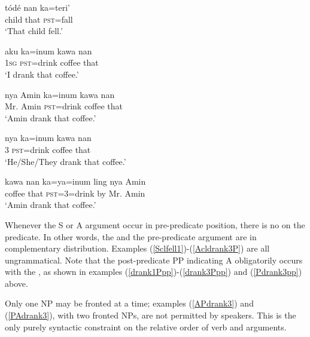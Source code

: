 \documentclass[output=paper
,modfonts
,nonflat]{langsci/langscibook}
\begin{document}
\ea\label{Sfell3}
\gll t\'od\'e nan ka=teri’\\
child that \textsc{pst}=fall\\
\glt `That child fell.’
\z

\ea\label{Adrank1P}
\gll aku	ka=inum		kawa	nan\\
\textsc{1sg}	\textsc{pst}=drink	coffee	that\\
\glt `I drank that coffee.’
\z

\ea\label{npdrank3P}
\gll nya Amin	ka=inum		kawa	nan\\
Mr. Amin	\textsc{pst}=drink	coffee	that\\
\glt `Amin drank that coffee.’
\z

\ea\label{prodrank3P}
\gll nya	ka=inum		kawa	nan\\
3		\textsc{pst}=drink	coffee	that\\
\glt `He/She/They drank that coffee.’
\z

\ea\label{Pdrank3pp}
\gll kawa	nan	ka=ya=inum	ling	nya Amin\\
coffee	that	\textsc{pst}=3=drink	by	Mr. Amin\\
\glt `Amin drank that coffee.’
\z

\noindent Whenever the S or A argument occur in pre-predicate position, there is no  on the predicate. In other words, the  and the pre-predicate argument are in complementary distribution. Examples (\ref{Sclfell1})-(\ref{Acldrank3P}) are all ungrammatical. Note that the post-predicate PP indicating A obligatorily occurs with the , as shown in examples (\ref{drank1Ppp})-(\ref{drank3Ppp}) and (\ref{Pdrank3pp}) above.

\z

\z

\z

\noindent Only one NP may be fronted at a time; examples (\ref{APdrank3}) and (\ref{PAdrank3}), with two fronted NPs, are not permitted by speakers. This is the only purely syntactic constraint on the relative order of verb and arguments. 
\end{document}
